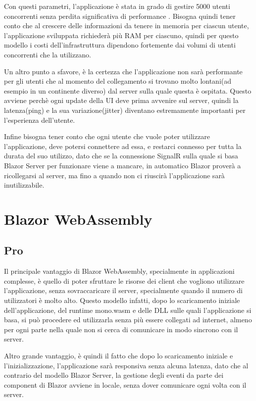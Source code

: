 Con questi parametri, l'applicazione \`e stata in grado di gestire 5000 utenti concorrenti senza perdita significativa di performance \cite{blazorModelsScenarios} \cite{bServerConcurrentUsersTest}.
Bisogna quindi tener conto che al crescere delle informazioni da tenere in memoria per ciascun utente, l'applicazione sviluppata richieder\`a pi\`u RAM per ciascuno, quindi per questo modello i costi dell'infrastruttura dipendono fortemente dai volumi di utenti concorrenti che la utilizzano.

Un altro punto a sfavore, \`e la certezza che l'applicazione non sar\`a performante per gli utenti che al momento del collegamento si trovano molto lontani(ad esempio in un continente diverso) dal server sulla quale questa \`e ospitata.
Questo avviene perch\`e ogni update della UI deve prima avvenire sul server, quindi la latenza(ping) e la sua variazione(jitter) diventano estremamente importanti per l'esperienza dell'utente.

Infine bisogna tener conto che ogni utente che vuole poter utilizzare l'applicazione, deve potersi connettere ad essa, e restarci connesso per tutta la durata del suo utilizzo, dato che se la connessione SignalR sulla quale si basa Blazor Server per funzionare viene a mancare, in automatico Blazor prover\`a a ricollegarsi al server, ma fino a quando non ci riuscir\`a l'applicazione sar\`a inutilizzabile.

\section{Blazor WebAssembly}\label{sez:scalabilitaBWA}
\subsection{Pro}\label{sez:proBWA}
Il principale vantaggio di Blazor WebAssembly, specialmente in applicazioni complesse, \`e quello di poter sfruttare le risorse dei client che vogliono utilizzare l'applicazione, senza sovraccaricare il server, specialmente quando il numero di utilizzatori \`e molto alto.
Questo modello infatti, dopo lo scaricamento iniziale dell'applicazione, del runtime mono.wasm e delle DLL sulle quali l'applicazione si basa, si pu\`o procedere ed utilizzarla senza pi\`u essere collegati ad internet, almeno per ogni parte nella quale non si cerca di comunicare in modo sincrono con il server.

Altro grande vantaggio, \`e quindi il fatto che dopo lo scaricamento iniziale e l'inizializzazione, l'applicazione sar\`a responsiva senza alcuna latenza, dato che al contrario del modello Blazor Server, la gestione degli eventi da parte dei component di Blazor avviene in locale, senza dover comunicare ogni volta con il server.

